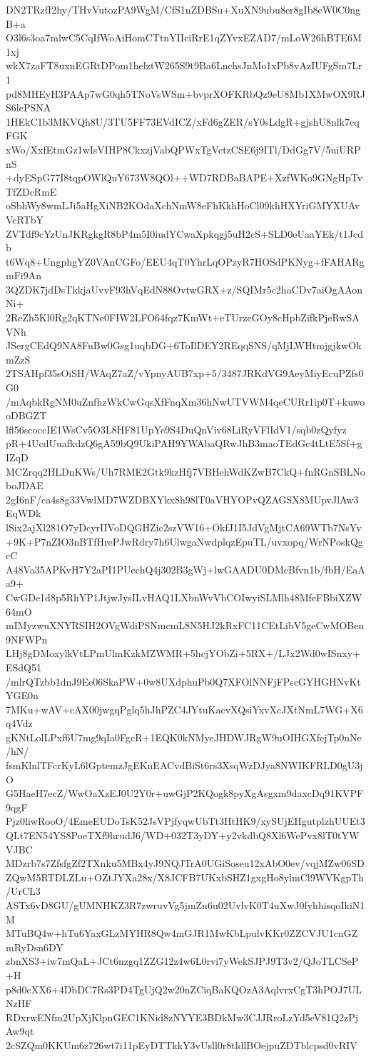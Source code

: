 DN2TRzfI2hy/THvVutozPA9WgM/CfS1nZDBSu+XuXN9ubu8er8gIb8eW0C0ngB+a
O3l6s3oa7mlwC5CqIfWoAiHomCTtnYIIciRrE1qZYvxEZAD7/mLoW26hBTE6M1xj
wkX7zaFT8uxnEGRtDPom1helztW265S9t9Ba6LnchsJnMo1xPb8vAzIUFgSm7Lr1
pd8MHEyH3PAAp7wG0qh5TNoVsWSm+bvprXOFKRbQz9eU8Mb1XMwOX9RJS6lePSNA
1HEkC1b3MKVQh8U/3TU5FF73EVdICZ/xFd6gZER/sY0sLdgR+gjshU8nlk7cqFGK
xWo/XxfEtmGz1wIsVIHP8CkxzjVabQPWxTgVctzCSE6j9ITl/DdGg7V/5uiURPnS
+dyESpG77I8tqpOWlQuY673W8QOl++WD7RDBaBAPE+XzfWKo9GNgHpTvTfZDcRmE
oSbhWy8wmLJi5aHgXiNB2KOdaXchNmW8eFhKkhHoCl09khHXYriGMYXUAvVcRTbY
ZVTdf9cYzUnJKRgkgR8bP4m5I0iudYCwaXpkqgj5uH2cS+SLD0eUaaYEk/t1Jcdb
t6Wq8+UngphgYZ0VAnCGFo/EEU4qT0YhrLqOPzyR7HOSdPKNyg+fFAHARgmFi9An
3QZDK7jdDsTkkjaUvvF93hVqEdN88OvtwGRX+z/SQIMr5c2haCDv7aiOgAAonNi+
2ReZh5Kl0Rg2qKTNe0FIW2LFO64fqz7KmWt+eTUrzeGOy8cHpbZifkPjeRwSAVNh
JSergCEdQ9NA8FuBw0Gsg1uqbDG+6ToIlDEY2REqqSNS/qMjLWHtmjgjkwOkmZzS
2TSAHpf35sOiSH/WAqZ7aZ/vYpnyAUB7xp+5/3487JRKdVG9AeyMiyEcuPZfs0G0
/mAqbkRgNM0uZnfhzWkCwGqsXfFnqXm36hNwUTVWM4qeCURr1ip0T+kuwooDBGZT
lfl56scoccIE1WsCv5O3L8HF81UpYe9S4DuQnViv68LiRyVFlIdV1/sqb0zQyfyz
pR+4UcdUuafkdzQ6gA59bQ9UkiPAH9YWAbaQRwJhB3maoTEdGc4tLtE5Sf+gIZqD
MCZrqq2HLDnKWs/Uh7RME2Gtk9kzHfj7VBHehWdKZwB7CkQ+fnRGnSBLNoboJDAE
2gI6nF/ca4s8g33VwlMD7WZDBXYkx8h98lT0aVHYOPvQZAGSX8MUpvJlAw3EqWDk
lSix2ajXl281O7yDcyrIIVoDQGHZic2szVW16+OkfJ1I5JdVgMjtCA69WTb7NsYv
+9K+P7nZIO3nBTfHrePJwRdry7h6UlwgaNwdplqzEpuTL/uvxopq/WrNPoskQgcC
A48Va35APKvH7Y2aPI1PUechQ4j302B3gWj+lwGAADU0DMcBfvn1b/fbH/EaAa9+
CwGDe1d8p5RhYP1JtjwJysILvHAQ1LXbnWvVbCOIwyiSLMlh48MfeFBbiXZW64mO
mIMyzwuXNYRSIH2OVgWdiPSNmcmL8N5HJ2kRxFC11CEtLibV5geCwMOBen9NFWPn
LHj8gDMoxylkVtLPmUlmKzkMZWMR+5hcjYObZi+5RX+/LJx2Wd0wISnxy+ESdQ51
/mlrQTzbb1dnJ9Ee06SkaPW+0w8UXdphuPb0Q7XFOlNNFjFPscGYHGHNvKtYGE0n
7MKu+wAV+cAX00jwgqPglq5hJhPZC4JYtuKacvXQsiYxvXcJXtNmL7WG+X6q4Vdz
gKNtLolLPxf6U7mg9qIa0FgcR+1EQK0kNMyeJHDWJRgW9uOIHGXfejTp0nNe/hN/
fsmKlnlTFcrKyL6lGptemzJgEKnEACvdBiSt6rs3XsqWzDJya8NWIKFRLD0gU3jO
G5HaeH7ecZ/WwOaXzEJ0U2Y0r+uwGjP2KQogk8pyXgAsgxm9daxcDq91KVPF9qgF
Pjz0liwRooO/4EmeEUDoTsK52JsVPjfyqwUbTt3HtHK9/xySUjEHgutplzhUUEt3
QLt7EN54YS8PoeTXf9hrudJ6/WD+032T3yDY+y2vkdbQ8Xl6WePvx8lT0tYWVJBC
MDzrb7s7ZfsfgZf2TXnku5MBx4yJ9NQJTrA0UGiSoseu12xAbO0ev/vqjMZw06SD
ZQwM5RTDLZLu+OZtJYXa28x/X8JCFB7UKxbSHZ1gxgHo8ylmCl9WVKgpTh/UrCL3
ASTx6vD8GU/gUMNHKZ3R7zwruvVg5jmZn6u02UvlvK0T4uXwJ0fyhhisqoIkiN1M
MTuBQ4w+hTu6YaxGLzMYHR8Qw4mGJR1MwKbLpulvKKr0ZZCVJU1cnGZmRyDsn6DY
zbnXS3+iw7mQaL+JCt6nzgq1ZZG12z4w6L0rvi7yWekSJPJ9T3v2/QJoTLCSeP+H
p8d0cXX6+4DbDC7Rs3PD4TgUjQ2w20nZCiqBaKQOzA3AqlvrxCgT3hPOJ7ULNzHF
RDxrwENfm2UpXjKlpnGEC1KNid8zNYYE3BDkMw3CJJRroLzYd5eV81Q2zPjAw9qt
2cSZQm0KKUm6z726wt7i11pEyDTTkkY3vUsll0r8tldlBOejpuZDTblcpsd0vRIV
